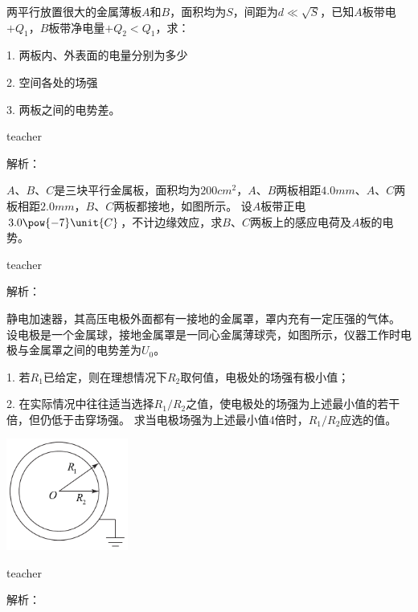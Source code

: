 \begin{example}
两平行放置很大的金属薄板$A$和$B$，面积均为$S$，间距为$d\ll\sqrt{S}$，已知$A$板带电$+Q_1$，$B$板带净电量$+Q_2<Q_1$，求：

1. 两板内、外表面的电量分别为多少

2. 空间各处的场强

3. 两板之间的电势差。
\begin{taggedblock}{teacher}

解析：
\end{taggedblock}
\end{example}

\begin{example}
$A、B、C$是三块平行金属板，面积均为$200\unit{cm^2}$，$A、B$两板相距$4.0\unit{mm}$、$A、C$两板相距$2.0\unit{mm}$，$B、C$两板都接地，如图所示。
设$A$板带正电$3.0\pow{-7}\unit{C}$，不计边缘效应，求$B$、$C$两板上的感应电荷及$A$板的电势。
\begin{taggedblock}{teacher}

解析：
\end{taggedblock}
\end{example}

\begin{example}

静电加速器，其高压电极外面都有一接地的金属罩，罩内充有一定压强的气体。
设电极是一个金属球，接地金属罩是一同心金属薄球壳，如图所示，仪器工作时电极与金属罩之间的电势差为$U_0$。

1. 若$R_1$已给定，则在理想情况下$R_2$取何值，电极处的场强有极小值；

2. 在实际情况中往往适当选择$R_1/R_2$之值，使电极处的场强为上述最小值的若干倍，但仍低于击穿场强。
求当电极场强为上述最小值4倍时，$R_1/R_2$应选的值。
\begin{flushright}
\includegraphics[width = 0.3\textwidth]{images/elec-problem-16.pdf} 
\end{flushright}
\begin{taggedblock}{teacher}

解析：
\end{taggedblock}
\end{example}



